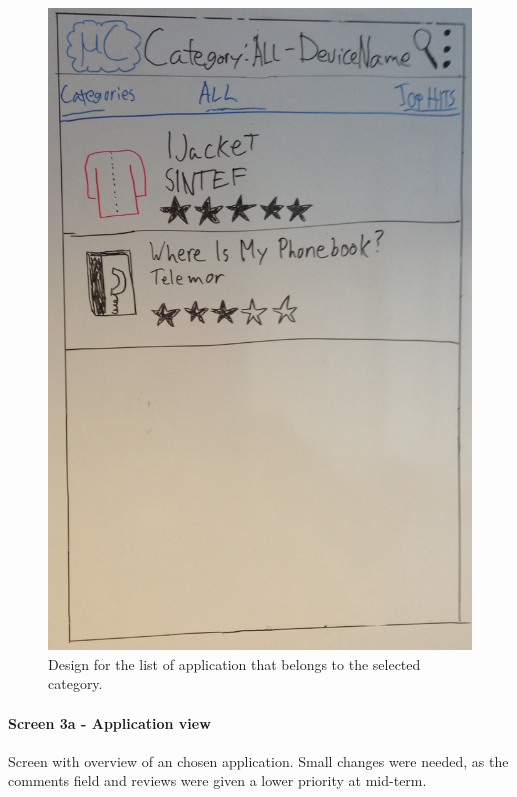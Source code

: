 \begin{figure}[H]
\centering
\includegraphics[scale=0.2]{images/Design_guide/Screen2b.png}
\caption[Screen 2b - Browse shop by category]{Design for the list of application that belongs to the selected category.}
\label{fig:screen2b}
\end{figure}


\paragraph{Screen 3a - Application view}
Screen with overview of an chosen application. Small changes were needed, as the comments field and reviews were given a lower priority at mid-term.

